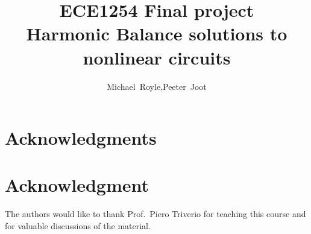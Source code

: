 \documentclass[12pt,journal,compsoc]{../ieeepaper/IEEEtran}
\begin{document}
\title{ECE1254 Final project \\ 
Harmonic Balance solutions to nonlinear circuits
}

\author{Michael~Royle,Peeter~Joot}


\maketitle

\IEEEdisplaynontitleabstractindextext
\IEEEpeerreviewmaketitle





\ifCLASSOPTIONcompsoc
  \section*{Acknowledgments}
\else
  \section*{Acknowledgment}
\fi


The authors would like to thank Prof.\ Piero Triverio for teaching this course and for valuable discussions of the material.

\ifCLASSOPTIONcaptionsoff
  \newpage
\fi


\label{app:bibliography}



\end{document}
